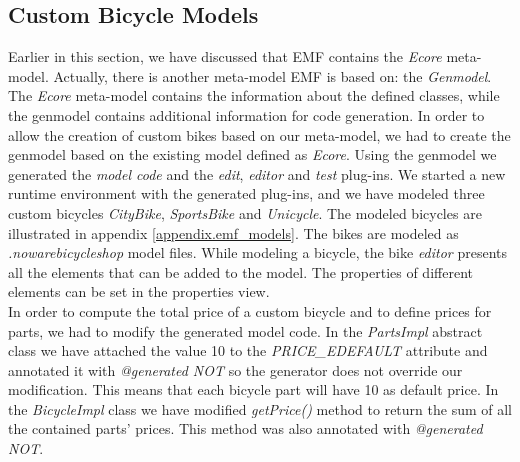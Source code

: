 \subsection{Custom Bicycle Models}
Earlier in this section, we have discussed that EMF contains the \emph{Ecore}
meta-model. Actually, there is another meta-model EMF is based on:
the \emph{Genmodel}. The \emph{Ecore} meta-model contains the information about
the defined classes, while the genmodel contains additional information for
code generation. In order to allow the creation of custom bikes based on our
meta-model, we had to create the genmodel based on the existing model defined as
\emph{Ecore}. Using the genmodel we generated the \emph{model code} and the
\emph{edit}, \emph{editor} and \emph{test} plug-ins. We started a new runtime
environment with the generated plug-ins, and we have modeled three custom bicycles
\emph{CityBike}, \emph{SportsBike} and \emph{Unicycle}. The modeled bicycles are
illustrated in appendix \ref{appendix.emf_models}. The bikes are modeled as
\emph{.nowarebicycleshop} model files. While modeling a bicycle, the bike
\emph{editor} presents all the elements that can be added to the model. The
properties of different elements can be set in the properties view.\\

\noindent In order to compute the total price of a custom bicycle and to define
prices for parts, we had to modify the generated model code. In the
\emph{PartsImpl} abstract class we have attached the value
10 to the \emph{PRICE\_EDEFAULT} attribute and annotated it with
\emph{@generated NOT} so the generator does not override our modification. This
means that each bicycle part will have 10 as default price. In the
\emph{BicycleImpl} class we have modified \emph{getPrice()} method to return the
sum of all the contained parts' prices. This method was also annotated with
\emph{@generated NOT}.

